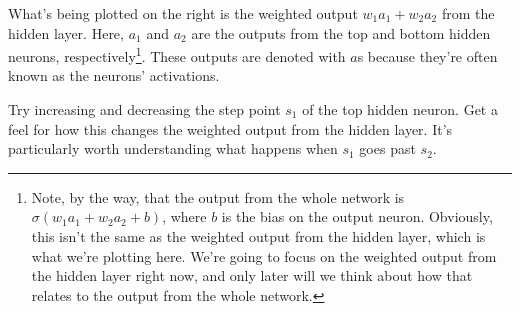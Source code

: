 What's being plotted on the right is the weighted output $w_1a_1+w_2a_2$ from the hidden layer. Here, $a_1$ and $a_2$ are the outputs from the top and bottom hidden neurons, respectively\footnote{Note, by the way, that the output from the whole network is $\sigma(w_1a_1+w_2a_2+b)$, where $b$ is the bias on the output neuron. Obviously, this isn't the same as the weighted output from the hidden layer, which is what we're plotting here. We're going to focus on the weighted output from the hidden layer right now, and only later will we think about how that relates to the output from the whole network.}. These outputs are denoted with $a$s because they're often known as the neurons' activations.

Try increasing and decreasing the step point $s_1$ of the top hidden neuron. Get a feel for how this changes the weighted output from the hidden layer. It's particularly worth understanding what happens when $s_1$ goes past $s_2$. 

